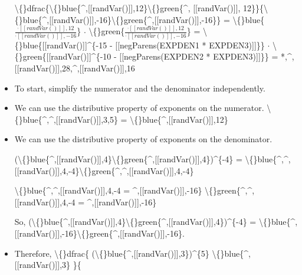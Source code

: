 \documentclass{article}
\begin{document}
\begin{itemize}
                            \textbackslash\{\}dfrac\{\textbackslash\{\}blue\{\textasciicircum{},[[randVar()]],12\}\textbackslash\{\}green\{\textasciicircum{}, [[randVar()]], 12\}\}\{\textbackslash\{\}blue\{\textasciicircum{},[[randVar()]],-16\}\textbackslash\{\}green\{\textasciicircum{},[[randVar()]],-16\}\} =
                            \textbackslash\{\}blue\{$\frac{^,[[randVar()]],12}{^,[[randVar()]],-16}$\} $\cdot$ \textbackslash\{\}green\{$\frac{^, [[randVar()]], 12}{^,[[randVar()]],-16}$\} =
                            \textbackslash\{\}blue\{[[randVar()]]\textasciicircum{}\{-15 - [[negParens(EXPDEN1 * EXPDEN3)]]\}\} $\cdot$
                            \textbackslash\{\}green\{[[randVar()]]\textasciicircum{}\{-10 - [[negParens(EXPDEN2 * EXPDEN3)]]\}\} = 
                            *,\textasciicircum{},[[randVar()]],28,\textasciicircum{},[[randVar()]],16
  \item To start, simplify the numerator and the denominator independently.
  \item We can use the distributive property of exponents on the numerator.
                        \textbackslash\{\}blue\{\textasciicircum{},\textasciicircum{},[[randVar()]],3,5\} = \textbackslash\{\}blue\{\textasciicircum{},[[randVar()]],12\}
  \item We can use the distributive property of exponents on the denominator.
                        
                            (\textbackslash\{\}blue\{\textasciicircum{},[[randVar()]],4\}\textbackslash\{\}green\{\textasciicircum{},[[randVar()]],4\})\textasciicircum{}\{-4\} = 
                            \textbackslash\{\}blue\{\textasciicircum{},\textasciicircum{},[[randVar()]],4,-4\}\textbackslash\{\}green\{\textasciicircum{},\textasciicircum{},[[randVar()]],4,-4\}
                        
                        
                            
                                \textbackslash\{\}blue\{\textasciicircum{},\textasciicircum{},[[randVar()]],4,-4 = \textasciicircum{},[[randVar()]],-16\}
                                \textbackslash\{\}green\{\textasciicircum{},\textasciicircum{},[[randVar()]],4,-4 = \textasciicircum{},[[randVar()]],-16\}
                            
                            So, 
                                (\textbackslash\{\}blue\{\textasciicircum{},[[randVar()]],4\}\textbackslash\{\}green\{\textasciicircum{},[[randVar()]],4\})\textasciicircum{}\{-4\} = 
                                \textbackslash\{\}blue\{\textasciicircum{},[[randVar()]],-16\}\textbackslash\{\}green\{\textasciicircum{},[[randVar()]],-16\}.
  \item Therefore, 
                            \textbackslash\{\}dfrac\{
                            (\textbackslash\{\}blue\{\textasciicircum{},[[randVar()]],3\})\textasciicircum{}\{5\}
                            \textbackslash\{\}blue\{\textasciicircum{},[[randVar()]],3\}
                            \}\{
                            

\end{itemize}
\end{document}

